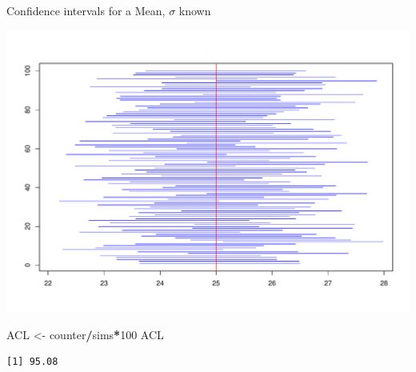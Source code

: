 \documentclass[
  ignorenonframetext,
]{beamer}
\newenvironment{Shaded}{\begin{snugshade}}{\end{snugshade}}
\newcommand{\DecValTok}[1]{\textcolor[rgb]{0.00,0.00,0.81}{#1}}
\newcommand{\NormalTok}[1]{#1}
\newcommand{\OtherTok}[1]{\textcolor[rgb]{0.56,0.35,0.01}{#1}}
\newcommand{\SpecialCharTok}[1]{\textcolor[rgb]{0.81,0.36,0.00}{\textbf{#1}}}
\begin{document}
\begin{frame}[fragile]{Confidence intervals for a Mean, \(\sigma\)
known}
\protect\hypertarget{confidence-intervals-for-a-mean-sigma-known-6}{}
\begin{center}\includegraphics[width=0.6\linewidth,height=0.7\textheight]{Week10A_files/figure-beamer/unnamed-chunk-47-1} \end{center}
\normalsize

\tiny

\begin{Shaded}
\begin{Highlighting}[]
\NormalTok{ACL }\OtherTok{\textless{}{-}}\NormalTok{ counter}\SpecialCharTok{/}\NormalTok{sims}\SpecialCharTok{*}\DecValTok{100}
\NormalTok{ACL}
\end{Highlighting}
\end{Shaded}

\begin{verbatim}
[1] 95.08
\end{verbatim}

\normalsize
\end{frame}
\end{document}
